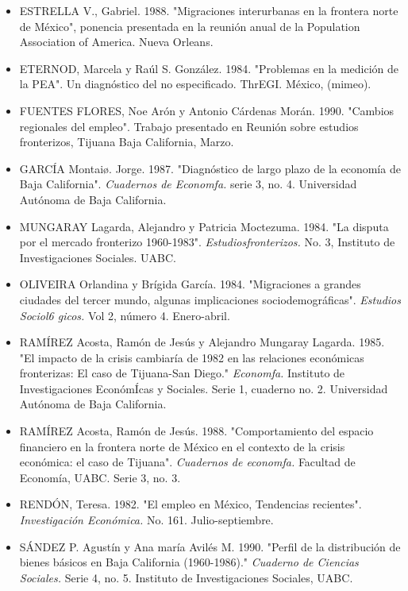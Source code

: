 \documentclass{article}
\begin{document}
\begin{itemize}
\item 
ESTRELLA V., Gabriel. 1988. "Migraciones interurbanas en la frontera norte de México", ponencia presentada en la reunión anual de la Population Association of America. Nueva Orleans.

\item 
ETERNOD, Marcela y Raúl S. González. 1984. "Problemas en la medición de la PEA". Un diagnóstico del no especificado. ThrEGI. México, (mimeo).

\item 
FUENTES FLORES, Noe Arón y Antonio Cárdenas Morán. 1990. "Cambios regionales del empleo". Trabajo presentado en Reunión sobre estudios fronterizos, Tijuana Baja California, Marzo.

\item 
GARCÍA Montai\o. Jorge. 1987. "Diagnóstico de largo plazo de la economía de Baja California". \textit{Cuadernos de Economfa.} serie 3, no. 4. Universidad Autónoma de Baja California.

\item 
MUNGARAY Lagarda, Alejandro y Patricia Moctezuma. 1984. "La disputa por el mercado fronterizo 1960-1983". \textit{Estudiosfronterizos.}  No. 3, Instituto de Investigaciones Sociales. UABC.

\item 
OLIVEIRA Orlandina y Brígida García. 1984. "Migraciones a grandes ciudades del tercer mundo, algunas implicaciones sociodemográficas". \textit{Estudios Sociol6 gicos.} Vol 2, número 4. Enero-abril.

\item 
RAMÍREZ Acosta, Ramón de Jesús y Alejandro Mungaray Lagarda. 1985. "El impacto de la crisis cambiaría de 1982 en las relaciones económicas fronterizas: El caso de Tijuana-San Diego." \textit{Economfa.} Instituto de Investigaciones EconómÍcas y Sociales. Serie 1, cuaderno no. 2. Universidad Autónoma de Baja California.

\item 
RAMÍREZ Acosta, Ramón de Jesús. 1988. "Comportamiento del espacio financiero en la frontera norte de México en el contexto de la crisis económica: el caso de Tijuana". \textit{Cuadernos de economfa.} Facultad de Economía, UABC. Serie 3, no. 3.

\item 
RENDÓN, Teresa. 1982. "El empleo en México, Tendencias recientes". \textit{Investigación Económica.} No. 161. Julio-septiembre.

\item 
SÁNDEZ P. Agustín y Ana maría Avilés M. 1990. "Perfil de la distribución de bienes básicos en Baja California (1960-1986)." \textit{Cuaderno de Ciencias Sociales.} Serie 4, no. 5. Instituto de Investigaciones Sociales, UABC.


\end{itemize}
\end{document}
